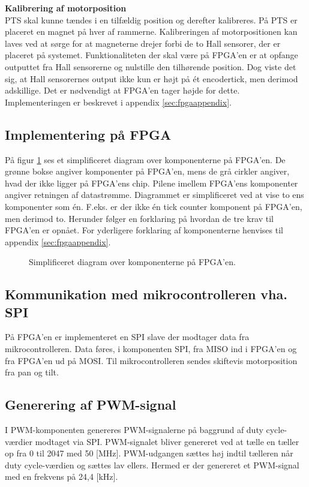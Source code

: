 \textbf{Kalibrering af motorposition}\\
PTS skal kunne tændes i en tilfældig position og derefter kalibreres.
På PTS er placeret en magnet på hver af rammerne.
Kalibreringen af motorpositionen kan laves ved at sørge for at magneterne drejer forbi 
de to Hall sensorer, der er placeret på systemet. 
Funktionaliteten der skal være på FPGA'en er at opfange outputtet fra 
Hall sensorerne og nulstille den tilhørende position.
Dog viste det sig, at Hall sensorernes output ikke kun er højt på ét encodertick, 
men derimod adskillige. Det er nødvendigt at FPGA'en tager højde for 
dette. Implementeringen er beskrevet i appendix \ref{sec:fpgaappendix}.

\subsection{Implementering på FPGA}
På figur \ref{fig:FPGA_blok} ses et simplificeret diagram over komponenterne på FPGA'en. 
De grønne bokse angiver komponenter på FPGA'en, mens de grå cirkler angiver, hvad der ikke ligger på 
FPGA'ens chip. Pilene imellem FPGA'ens komponenter angiver retningen af 
datastrømme. Diagrammet er simplificeret ved at vise to ens komponenter som én. 
F.eks. er der ikke én tick counter komponent på FPGA'en, men derimod to.
Herunder følger en forklaring på hvordan de tre krav til FPGA'en er opnået. For 
yderligere forklaring af komponenterne henvises til appendix 
\ref{sec:fpgaappendix}.

\begin{figure}[!th]
\centering
\begin{tikzpicture}[node distance = 5 cm,scale=1]

\end{tikzpicture}
\caption[Diagram over FPGA komponenter]{Simplificeret diagram over komponenterne på FPGA'en.}
\label{fig:FPGA_blok}
\end{figure}

\subsection[Kommunikation]{Kommunikation med mikrocontrolleren vha. SPI}
På FPGA'en er implementeret en SPI slave der modtager data fra 
mikrocontrolleren. Data føres, i komponenten SPI, fra MISO ind i FPGA'en og fra FPGA'en ud på 
MOSI. Til mikrocontrolleren sendes skiftevis motorposition fra pan og tilt.

\subsection{Generering af PWM-signal}
I PWM-komponenten genereres PWM-signalerne på baggrund af duty cycle-værdier modtaget via SPI. 
PWM-signalet bliver genereret ved at tælle en tæller op fra 0 til 2047 med 50 [MHz].
PWM-udgangen sættes høj indtil tælleren når duty cycle-værdien og sættes lav 
ellers. Hermed er der genereret et PWM-signal med en frekvens på 24,4 [kHz].

